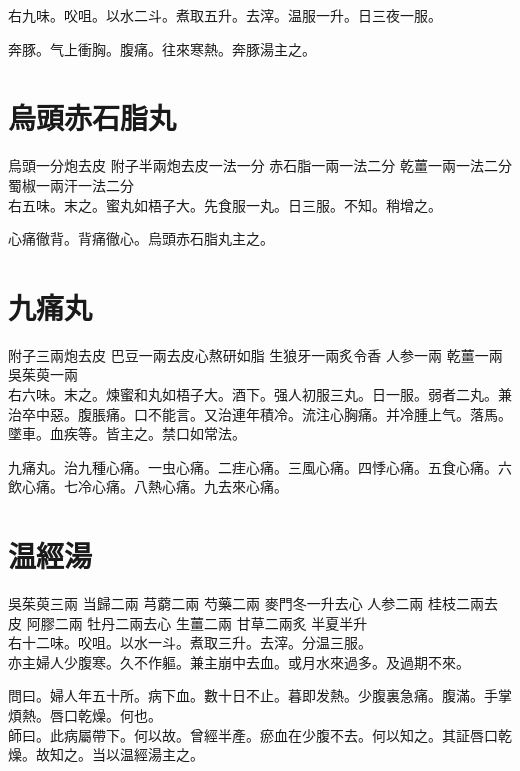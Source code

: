 右九味。{\khaaitp 㕮咀。}以水二斗。煮取五升。{\khaaitp 去滓。}温服一升。日三夜一服。

奔豚。气上衝胸。腹痛。往來寒熱。奔豚湯主之。

\section{烏頭赤石脂丸}

烏頭{\scriptsize 一分炮去皮} 附子{\scriptsize 半兩炮去皮一法一分} 赤石脂{\scriptsize 一兩一法二分} 乾薑{\scriptsize 一兩一法二分} 蜀椒{\scriptsize 一兩汗一法二分}\\
右五味。末之。蜜丸如梧子大。先食服一丸。日三服。不知。稍增之。

心痛徹背。背痛徹心。烏頭赤石脂丸主之。

\section{九痛丸}

附子{\scriptsize 三兩炮去皮} 巴豆{\scriptsize 一兩去皮心熬研如脂} 生狼牙{\scriptsize 一兩炙令香} 人参{\scriptsize 一兩} 乾薑{\scriptsize 一兩} 吳茱萸{\scriptsize 一兩}\\
右六味。末之。煉蜜和丸如梧子大。酒下。强人初服三丸。日一服。弱者二丸。兼治卒中惡。腹脹痛。口不能言。又治連年積冷。流注心胸痛。并冷腫上气。落馬。墜車。血疾等。皆主之。禁口如常法。{\wuben}

{\dengben}%

九痛丸。治九種心痛。{\khaaitp 一虫心痛。二疰心痛。三風心痛。四悸心痛。五食心痛。六飲心痛。七冷心痛。八熱心痛。九去來心痛。}

\section{温經湯}

吳茱萸{\scriptsize 三兩} 当歸{\scriptsize 二兩} 芎藭{\scriptsize 二兩} 芍藥{\scriptsize 二兩} 麥門冬{\scriptsize 一升去心} 人参{\scriptsize 二兩} 桂枝{\scriptsize 二兩去皮} 阿膠{\scriptsize 二兩} 牡丹{\scriptsize 二兩去心} 生薑{\scriptsize 二兩} 甘草{\scriptsize 二兩炙} 半夏{\scriptsize 半升}\\
右十二味。㕮咀。以水一斗。煮取三升。去滓。分温三服。\\
亦主婦人少腹寒。久不作軀。兼主崩中去血。或月水來過多。及過期不來。

問曰。婦人年五十所。病下血。數十日不止。暮即发熱。少腹裏急{\khaaitp 痛}。腹滿。手掌煩熱。唇口乾燥。何也。\\
師曰。此病屬帶下。何以故。曾經半產。瘀血在少腹不去。何以知之。其証唇口乾燥。故知之。当以温經湯主之。

